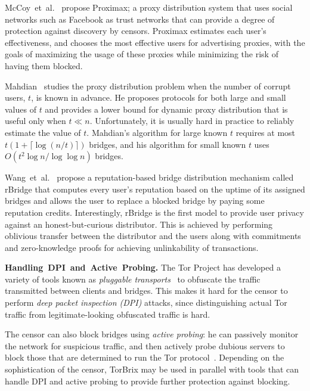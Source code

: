 \documentclass[letterpaper,twocolumn,10pt]{article}
\newcommand{\etal}{et~al.}
\newcommand{\eg}{e.g.}
\newcommand{\sfsize}{\fontsize{0.73\baselineskip}{0.73\baselineskip}\selectfont}
\newcommand{\sans}[1]{\textsf{\sfsize \mbox{#1}}}
\newcommand{\sansb}[1]{\textbf{\sans{\mbox{#1}}}}
\newcommand{\para}[1]{\vspace{0.55em} \noindent \sansb{{\mbox{#1}}}}
\newcommand{\brix}{\sans{TorBrix}\xspace}
\begin{document}
McCoy~\etal~\cite{McCoy:FC:2011} propose Proximax; a proxy distribution system that uses social networks such as Facebook as trust networks that can provide a degree of protection against discovery by censors. Proximax estimates each user's effectiveness, and chooses the most effective users for advertising proxies, with the goals of maximizing the usage of these proxies while minimizing the risk of having them blocked.

Mahdian~\cite{Mahdian:2010} studies the proxy distribution problem when the number of corrupt users, $t$, is known in advance. He proposes protocols for both large and small values of $t$ and provides a lower bound for dynamic proxy distribution that is useful only when ${t \ll n}$.
Unfortunately, it is usually hard in practice to reliably estimate the value of $t$. Mahdian's algorithm for large known $t$ requires at most ${t\left(1 + \lceil \log{(n/t)} \rceil \right)}$ bridges, and his algorithm for small known $t$ uses ${O(t^2 \log{n} / \log{\log{n}})}$ bridges.

Wang~\etal~\cite{WangLBH:rBridge:13} propose a reputation-based bridge distribution mechanism called rBridge that computes every user's reputation based on the uptime of its assigned bridges and allows the user to replace a blocked bridge by paying some reputation credits. Interestingly, rBridge is the first model to provide user privacy against an honest-but-curious distributor. This is achieved by performing oblivious transfer between the distributor and the users along with commitments and zero-knowledge proofs for achieving unlinkability of transactions.

\para{Handling DPI and Active Probing.} The Tor Project has developed a variety of tools known as \emph{pluggable transports}~\cite{Tor:PluggableTransport} to obfuscate the traffic transmitted between clients and bridges. This makes it hard for the censor to perform \emph{deep packet inspection (DPI)} attacks, since distinguishing actual Tor traffic from legitimate-looking obfuscated traffic is hard.

The censor can also block bridges using \emph{active probing}: he can passively monitor the network for suspicious traffic, and then actively probe dubious servers to block those that are determined to run the Tor protocol~\cite{Ensafi2015b}.
Depending on the sophistication of the censor, \brix may be used in parallel with tools that can handle DPI and active probing to provide further protection against blocking.
\end{document}
